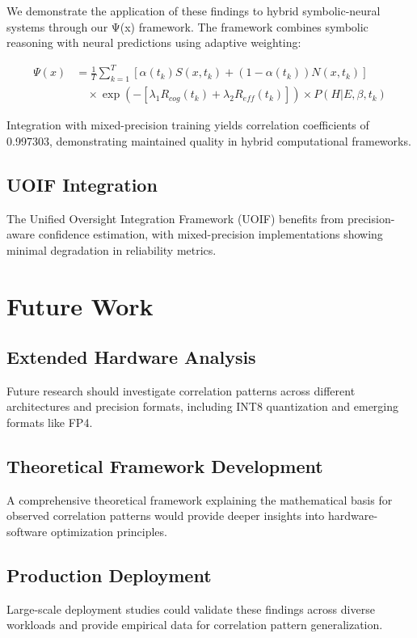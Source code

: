 \documentclass[conference]{IEEEtran}
\begin{document}
We demonstrate the application of these findings to hybrid symbolic-neural systems through our Ψ(x) framework. The framework combines symbolic reasoning with neural predictions using adaptive weighting:

\begin{align}
\Psi(x) &= \frac{1}{T} \sum_{k=1}^{T} [\alpha(t_k)S(x,t_k) + (1-\alpha(t_k))N(x,t_k)] \\
&\quad \times \exp(-[\lambda_1 R_{cog}(t_k) + \lambda_2 R_{eff}(t_k)]) \times P(H|E,\beta,t_k)
\end{align}

Integration with mixed-precision training yields correlation coefficients of 0.997303, demonstrating maintained quality in hybrid computational frameworks.

\subsection{UOIF Integration}

The Unified Oversight Integration Framework (UOIF) benefits from precision-aware confidence estimation, with mixed-precision implementations showing minimal degradation in reliability metrics.

\section{Future Work}

\subsection{Extended Hardware Analysis}
Future research should investigate correlation patterns across different architectures and precision formats, including INT8 quantization and emerging formats like FP4.

\subsection{Theoretical Framework Development}
A comprehensive theoretical framework explaining the mathematical basis for observed correlation patterns would provide deeper insights into hardware-software optimization principles.

\subsection{Production Deployment}
Large-scale deployment studies could validate these findings across diverse workloads and provide empirical data for correlation pattern generalization.
\end{document}
